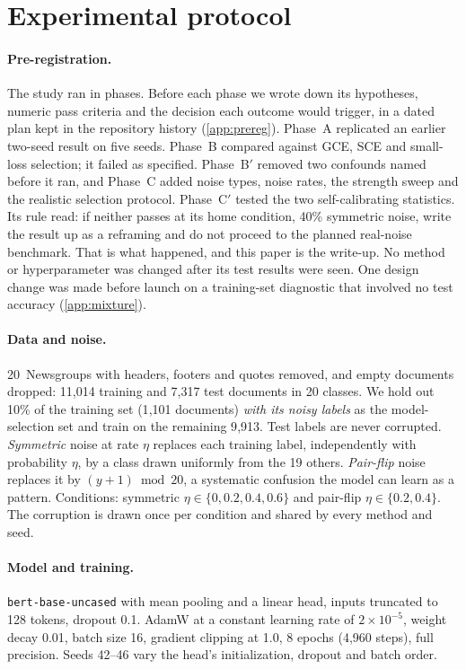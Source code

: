 \section{Experimental protocol}
\label{sec:setup}

\paragraph{Pre-registration.}
The study ran in phases. Before each phase we wrote down its hypotheses, numeric pass criteria and
the decision each outcome would trigger, in a dated plan kept in the repository history
(\cref{app:prereg}). Phase~A replicated an earlier two-seed result on five seeds. Phase~B compared
against GCE, SCE and small-loss selection; it failed as specified. Phase~B$'$ removed two
confounds named before it ran, and Phase~C added noise types, noise rates, the strength sweep and
the realistic selection protocol. Phase~C$'$ tested the two self-calibrating statistics. Its rule
read: if neither passes at its home condition, 40\% symmetric noise, write the result up as a
reframing and do not proceed to the planned real-noise benchmark. That is what happened, and this
paper is the write-up. No method or hyperparameter was changed after its test results were seen.
One design change was made before launch on a training-set diagnostic that involved no test
accuracy (\cref{app:mixture}).

\paragraph{Data and noise.}
20~Newsgroups \citep{lang1995newsweeder} with headers, footers and quotes removed, and empty
documents dropped: 11{,}014 training and 7{,}317 test documents in 20 classes. We hold out 10\% of
the training set (1{,}101 documents) \emph{with its noisy labels} as the model-selection set and
train on the remaining 9{,}913. Test labels are never corrupted. \emph{Symmetric} noise at rate
$\eta$ replaces each training label, independently with probability $\eta$, by a class drawn
uniformly from the 19 others. \emph{Pair-flip} noise \citep{han2018coteaching} replaces it by
$(y + 1) \bmod 20$, a systematic confusion the model can learn as a pattern. Conditions: symmetric
$\eta \in \{0, 0.2, 0.4, 0.6\}$ and pair-flip $\eta \in \{0.2, 0.4\}$. The corruption is drawn once
per condition and shared by every method and seed.

\paragraph{Model and training.}
\texttt{bert-base-uncased} \citep{devlin2019bert} with mean pooling and a linear head, inputs
truncated to 128 tokens, dropout 0.1. AdamW \citep{loshchilov2019adamw} at a constant learning
rate of $2\times10^{-5}$, weight decay 0.01, batch size 16, gradient clipping at 1.0, 8 epochs
(4{,}960 steps), full precision. Seeds 42--46 vary the head's initialization, dropout and batch
order.


